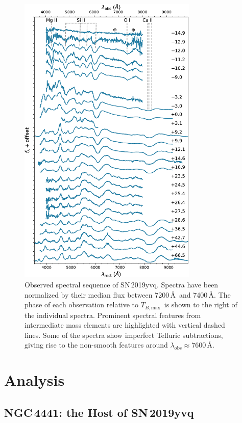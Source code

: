 \documentclass[twocolumn]{aastex63}
\newcommand{\tbmax}{$T_{B,\mathrm{max}}$}
\newcommand{\sn}{SN\,2019yvq}
\begin{document}
\begin{figure}
    \centering
    \includegraphics[width=3.35in]{./figures/spec_evo.pdf}
    \caption{Observed spectral sequence of \sn. Spectra have been normalized
    by their median flux between 7200\,\AA\ and 7400\,\AA. The phase of each
    observation relative to \tbmax\ is shown to the right of the individual
    spectra. Prominent spectral features from intermediate mass elements are
    highlighted with vertical dashed lines. Some of the spectra show
    imperfect Telluric subtractions, giving rise to the non-smooth features
    around $\lambda_\mathrm{obs} \approx 7600$\,\AA.}
    \label{fig:spec_evo}
\end{figure}


\section{Analysis}\label{sec:analysis}

\subsection{NGC\,4441: the Host of \sn}\label{sec:host}
\end{document}
